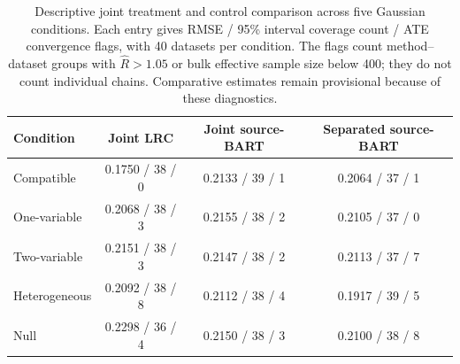 \begin{table}[!htbp]
\centering
\caption{Descriptive joint treatment and control comparison across five Gaussian conditions. Each entry gives RMSE / 95\% interval coverage count / ATE convergence flags, with 40 datasets per condition. The flags count method--dataset groups with $\widehat R>1.05$ or bulk effective sample size below 400; they do not count individual chains. Comparative estimates remain provisional because of these diagnostics.}
\label{tab:joint_primary}
\setlength{\tabcolsep}{3.5pt}
\footnotesize
\begin{tabular}{lccc}
\toprule
Condition & Joint LRC & Joint source-BART & Separated source-BART\\
\midrule
Compatible & 0.1750 / 38 / 0 & 0.2133 / 39 / 1 & 0.2064 / 37 / 1\\
One-variable & 0.2068 / 38 / 3 & 0.2155 / 38 / 2 & 0.2105 / 37 / 0\\
Two-variable & 0.2151 / 38 / 3 & 0.2147 / 38 / 2 & 0.2113 / 37 / 7\\
Heterogeneous & 0.2092 / 38 / 8 & 0.2112 / 38 / 4 & 0.1917 / 39 / 5\\
Null & 0.2298 / 36 / 4 & 0.2150 / 38 / 3 & 0.2100 / 38 / 8\\
\bottomrule
\end{tabular}
\end{table}
